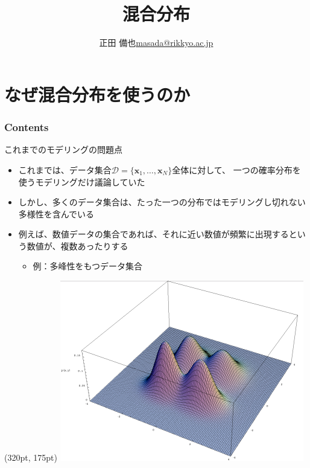 \documentclass[aspectratio=169,unicode,dvipdfmx,14pt]{beamer}
\title{ \\混合分布}
\author{\texorpdfstring{正田 備也\newline\href{mailto:masada@rikkyo.ac.jp}{masada@rikkyo.ac.jp}}{正田 備也}}
\date{}
\begin{document}
\begin{frame}
\titlepage
\end{frame}

\section{なぜ混合分布を使うのか}

\begin{frame}\frametitle{Contents}
\Large \tableofcontents[currentsection]
\end{frame}

\begin{frame}{これまでのモデリングの問題点}
\begin{itemize}
\item これまでは、データ集合$\mathcal{D}=\{\bm{x}_1, \ldots, \bm{x}_N\}$全体に対して、
一つの確率分布を使うモデリングだけ議論していた
\item しかし、多くのデータ集合は、たった一つの分布ではモデリングし切れない多様性を含んでいる
\item 例えば、数値データの集合であれば、それに近い数値が頻繁に出現するという数値が、複数あったりする
\begin{itemize}
\item 例：多峰性をもつデータ集合
\end{itemize}
\end{itemize}
\begin{textblock*}{0.4\linewidth}(320pt, 175pt)
    \centering
    \includegraphics[width=0.7\linewidth]{Bimodal-bivariate-small.png}
\end{textblock*}

\end{frame}
\end{document}
